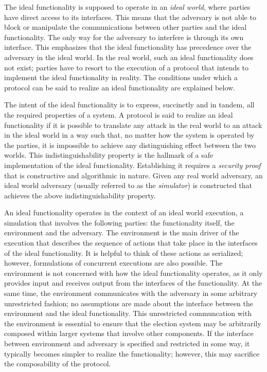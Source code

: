 The ideal functionality is supposed to operate in an \emph{ideal
  world}, where parties have direct access to its interfaces. This
means that the adversary is not able to block or manipulate the
communications between other parties and the ideal functionality. The
only way for the adversary to interfere is through its own
interface. This emphasizes that the ideal functionality has precedence
over the adversary in the ideal world. In the real world, such an
ideal functionality does not exist; parties have to resort to the
execution of a protocol that intends to implement the ideal
functionality in reality. The conditions under which a protocol can be
said to realize an ideal functionality are explained below.

The intent of the ideal functionality is to express, succinctly and in
tandem, all the required properties of a system. A protocol is said to
realize an ideal functionality if it is possible to translate any
attack in the real world to an attack in the ideal world in a way such
that, no matter how the system is operated by the parties, it is
impossible to achieve any distinguishing effect between the two
worlds. This indistinguishability property is the hallmark of a safe
implementation of the ideal functionality. Establishing it requires a
\emph{security proof} that is constructive and algorithmic in
nature. Given any real world adversary, an ideal world adversary
(usually referred to as the \emph{simulator}) is constructed that
achieves the above indistinguishability property.

An ideal functionality operates in the context of an ideal world
execution, a simulation that involves the following parties: the
functionality itself, the environment and the adversary. The
environment is the main driver of the execution that describes the
sequence of actions that take place in the interfaces of the ideal
functionality. It is helpful to think of these actions as serialized;
however, formulations of concurrent executions are also possible. The
environment is not concerned with how the ideal functionality
operates, as it only provides input and receives output from the
interfaces of the functionality. At the same time, the environment
communicates with the adversary in some arbitrary unrestricted
fashion; no assumptions are made about the interface between the
environment and the ideal functionality. This unrestricted
communcation with the environment is essential to ensure that the
election system may be arbitrarily composed within larger systems that
involve other components. If the interface between environment and
adversary is specified and restricted in some way, it typically
becomes simpler to realize the functionality; however, this may
sacrifice the composability of the protocol.

